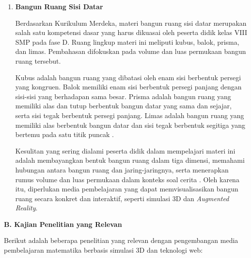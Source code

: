 \begin{enumerate}
    \item \textbf{Bangun Ruang Sisi Datar}
    
    \hspace*{1cm}Berdasarkan Kurikulum Merdeka, materi bangun ruang sisi datar merupakan salah satu kompetensi dasar yang harus dikuasai oleh peserta didik kelas VIII SMP pada fase D. Ruang lingkup materi ini meliputi kubus, balok, prisma, dan limas. Pembahasan difokuskan pada volume dan luas permukaan bangun ruang tersebut.
    
    \hspace*{1cm}Kubus adalah bangun ruang yang dibatasi oleh enam sisi berbentuk persegi yang kongruen. Balok memiliki enam sisi berbentuk persegi panjang dengan sisi-sisi yang berhadapan sama besar. Prisma adalah bangun ruang yang memiliki alas dan tutup berbentuk bangun datar yang sama dan sejajar, serta sisi tegak berbentuk persegi panjang. Limas adalah bangun ruang yang memiliki alas berbentuk bangun datar dan sisi tegak berbentuk segitiga yang bertemu pada satu titik puncak \citep{kemdikbud2018}.
    
    \hspace*{1cm}Kesulitan yang sering dialami peserta didik dalam mempelajari materi ini adalah membayangkan bentuk bangun ruang dalam tiga dimensi, memahami hubungan antara bangun ruang dan jaring-jaringnya, serta menerapkan rumus volume dan luas permukaan dalam konteks soal cerita \citep{nctm2000}. Oleh karena itu, diperlukan media pembelajaran yang dapat memvisualisasikan bangun ruang secara konkret dan interaktif, seperti simulasi 3D dan \textit{Augmented Reality}.

    

\end{enumerate}

\textbf{B. Kajian Penelitian yang Relevan}

\hspace*{1cm}Berikut adalah beberapa penelitian yang relevan dengan pengembangan media pembelajaran matematika berbasis simulasi 3D dan teknologi web:

